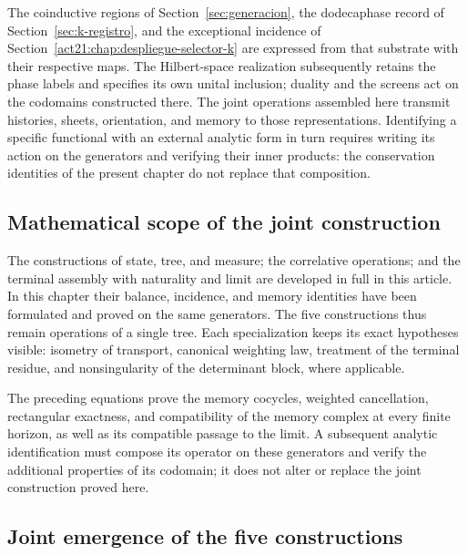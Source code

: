 The coinductive regions of Section~\ref{sec:generacion}, the dodecaphase
record of Section~\ref{sec:k-registro}, and the exceptional incidence
of Section~\ref{act21:chap:despliegue-selector-k} are expressed from that substrate with their
respective maps. The Hilbert-space realization subsequently retains the phase
labels and specifies its own unital inclusion; duality and the screens
act on the codomains constructed there. The joint operations assembled here
transmit histories, sheets, orientation, and memory to those
representations. Identifying a specific functional with an external analytic
form in turn requires writing its action on the generators and verifying
their inner products: the conservation identities of the present chapter
do not replace that composition.

\subsection{Mathematical scope of the joint construction}
The constructions of state, tree, and measure; the correlative operations; and
the terminal assembly with naturality and limit are developed in full
in this article. In this chapter their balance, incidence, and memory
identities have been formulated and proved on the same
generators. The five constructions thus remain operations of a
single tree. Each specialization keeps its exact hypotheses visible:
isometry of transport, canonical weighting law, treatment of the terminal
residue, and nonsingularity of the determinant block, where applicable.

The preceding equations prove the memory cocycles, weighted cancellation,
rectangular exactness, and compatibility of the memory complex at every
finite horizon, as well as its compatible passage to the limit.
A subsequent analytic identification must compose its operator on these
generators and verify the additional properties of its codomain; it does not
alter or replace the joint construction proved here.

\iffalse
\subsection{Joint emergence of the five constructions}
\label{act21:sec:cinco-construcciones-continuo-ch}

